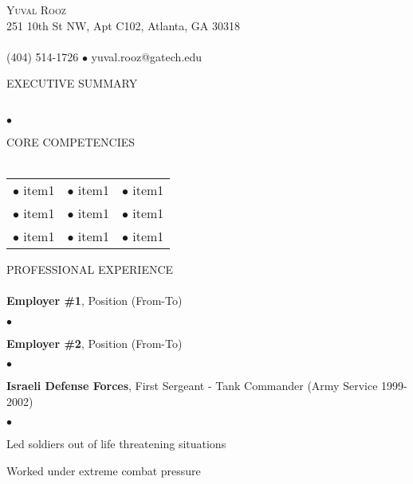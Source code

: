 \documentclass[12pt]{article}
\newcommand{\lineunder}{\vspace*{-9pt} \\ \hspace*{-18pt} \hrulefill \\}
\newcommand{\header}[1]{{\hspace*{-15pt}\vspace*{6pt} \textsc{#1}} \vspace*{-9pt} \lineunder}
\newcommand{\employer}[2]{{ #1 (#2) }}
\newcommand{\contact}[3]{
\vspace*{-11pt}
\begin{center}
{\LARGE \scshape {#1}}\\
#2 \lineunder
#3
\end{center}
\vspace*{-4pt}
}
\newenvironment{achievements}{\begin{list}{$\bullet$}{\topsep 0pt \itemsep -2pt}}{\vspace*{4pt}\end{list}}
\begin{document}
\small
\smallskip
\vspace*{-44pt}

\contact{\LARGE{Yuval Rooz}}
{251 10th St NW, Apt C102, Atlanta, GA 30318}
{(404) 514-1726 $\bullet$ yuval.rooz@gatech.edu}

\header{EXECUTIVE SUMMARY}
	\begin{achievements}
  	\item
  	\item
  	\item
  	\item
  	\item
  \end{achievements}

\header{CORE COMPETENCIES}
\begin{center}
  \begin{tabular}{c c c}
    $\bullet$ item1 & $\bullet$ item1 & $\bullet$ item1 \\
    $\bullet$ item1 & $\bullet$ item1 & $\bullet$ item1 \\
    $\bullet$ item1 & $\bullet$ item1 & $\bullet$ item1
  \end{tabular}
\end{center}

\header{PROFESSIONAL EXPERIENCE}
  \employer{\textbf{Employer \#1}, Position}{From-To}
    \begin{achievements}
      \item
      \item
      \item
      \item
      \item
    \end{achievements}

  \employer{\textbf{Employer \#2}, Position}{From-To}
    \begin{achievements}
      \item
      \item
      \item
      \item
      \item
    \end{achievements}

  \employer{\textbf{Israeli Defense Forces}, First Sergeant - Tank Commander}{Army Service 1999-2002}
  	\begin{achievements}
      \item Led soldiers out of life threatening situations
    	\item Worked under extreme combat pressure
  	\end{achievements}
\end{document}
